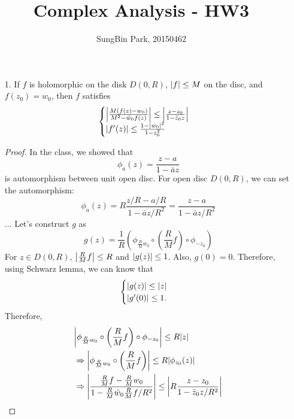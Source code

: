 \documentclass{article}
\begin{document}
\title{Complex Analysis - HW3}
\author{SungBin Park, 20150462} 

\maketitle
\begin{enumerate}
\item[1.] If $f$ is holomorphic on the disk $D(0, R)$, $\abs{f}\leq M$ on the disc, and $f(z_0)=w_0$, then $f$ satisfies
\begin{equation*}
\begin{cases}
\abs{\frac{M(f(z)-w_0)}{M^2-\bar{w}_0 f(z)}}\leq \abs{\frac{z-z_0}{1-\bar{z}_0 z}} \\
\abs{f'(z)}\leq \frac{1-\abs{w_0}^2}{1-z_0^2}
\end{cases}
\end{equation*}
\begin{proof}
In the class, we showed that
\begin{equation*}
\phi_a(z)=\frac{z-a}{1-\bar{a}z}
\end{equation*}
is automorphism between unit open disc. For open disc $D(0, R)$, we can set the automorphism:
\begin{equation*}
\phi_a(z)=R\frac{z/R-a/R}{1-\bar{a}z/R^2}=\frac{z-a}{1-\bar{a}z/R^2}
\end{equation*}
...
Let's construct $g$ as
\begin{equation*}
g(z)=\frac{1}{R}\left(\phi_{\frac{R}{M}w_0}\circ \left(\frac{R}{M}f\right)\circ \phi_{-z_0}\right)
\end{equation*}
For $z\in D(0, R)$, $\abs{\frac{R}{M}f}\leq R$ and $\abs{g(z)}\leq 1$. Also, $g(0)=0$. Therefore, using Schwarz lemma, we can know that
\begin{equation*}
\begin{cases}
\abs{g(z)}\leq \abs{z} \\
\abs{g'(0)}\leq 1.
\end{cases}
\end{equation*}
Therefore,
\begin{equation*}
\begin{split}
&\abs{\phi_{\frac{R}{M}w_0}\circ \left(\frac{R}{M}f\right)\circ \phi_{-z_0}}\leq R\abs{z} \\
&\Rightarrow \abs{\phi_{\frac{R}{M}w_0}\circ \left(\frac{R}{M}f\right)}\leq R\abs{\phi_{z_0}(z)} \\
&\Rightarrow \abs{\frac{\frac{R}{M}f-\frac{R}{M}w_0}{1-\frac{R}{M}\bar{w}_0\frac{R}{M}f/R^2}}\leq \abs{R\frac{z-z_0}{1-\bar{z}_0z/R^2}}\\

\end{split}
\end{equation*}
\end{proof}
\end{enumerate}
\end{document}
